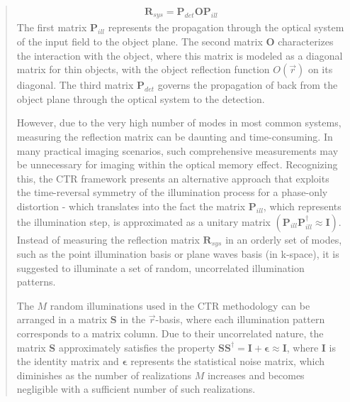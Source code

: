 \documentclass[12pt]{article}
\newenvironment{ourresponse}
    {\begin{tcolorbox}[width=\linewidth,breakable,enhanced,colback=gray!5,colframe=responsecolor!50,title=Response,left=5pt,right=5pt]}
    {\end{tcolorbox}}
\begin{document}
\begin{enumerate}[label=\arabic*.]
\begin{ourresponse}
\begin{quote}
            \begin{eqnarray}
            \bm{R}_{sys} = \bm{P}_{det}\bm{O}\bm{P}_{ill}
            \label{eq:2}
            \end{eqnarray}
            The first matrix $\bm{P}_{ill}$ represents the propagation through the optical system of the input field to the object plane. The second matrix $\bm{O}$ characterizes the interaction with the object, where this matrix is modeled as a diagonal matrix for thin objects, with the object reflection function $O(\vec{r})$ on its diagonal. The third matrix $\bm{P}_{det}$ governs the propagation of back from the object plane through the optical system to the detection. 
            
            However, due to the very high number of modes in most common systems, measuring the reflection matrix can be daunting and time-consuming. In many practical imaging scenarios, such comprehensive measurements may be unnecessary for imaging within the optical memory effect. Recognizing this, the CTR framework \cite{lee22} presents an alternative approach that exploits the time-reversal symmetry of the illumination process for a phase-only distortion - which translates into the fact the matrix $\bm{P}_{ill}$, which represents the illumination step, is approximated as a unitary matrix $(\bm{P}_{ill}\bm{P}^\dagger_{ill} \approx \mathbf{I})$.
            Instead of measuring the reflection matrix $\bm{R}_{sys}$ in an orderly set of modes, such as the point illumination basis or plane waves basis (in k-space), it is suggested to illuminate a set of random, uncorrelated illumination patterns.
            
            The $M$ random illuminations used in the CTR methodology can be arranged in a matrix $\bm{S}$ in the $\vec{r}$-basis, where each illumination pattern corresponds to a matrix column. Due to their uncorrelated nature, the matrix \textbf{S} approximately satisfies the property $\bm{S} \bm{S}^\dagger = \mathbf{I} + \mathbf{\epsilon} \approx \mathbf{I}$, where $\bm{I}$ is the identity matrix and $\mathbf{\epsilon}$ represents the statistical noise matrix, which diminishes as the number of realizations $M$ increases and becomes negligible with a sufficient number of such realizations.
            
            
            

\end{quote}
\end{ourresponse}
\end{enumerate}
\end{document}
